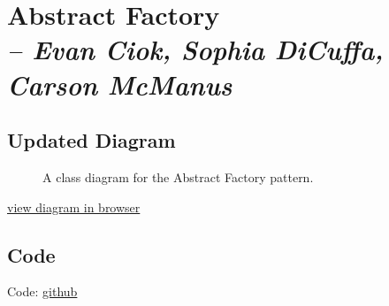 \chapter{Abstract Factory \\
  \small{\textit{-- Evan Ciok, Sophia DiCuffa, Carson McManus}}
  \label{Chapter::AbstractFactory}}

\section{Updated Diagram}

\begin{figure}[htb]
  \centering
  \caption{\label{Figure::pizzadiagram} A class diagram for the Abstract Factory pattern.}
\end{figure}

\href{https://github.com/dyc3/ssw345-group-assignments/blob/main/Figures/abstractFactory/figures-source.md}{view diagram in browser}

\section{Code}

Code: \href{https://github.com/dyc3/ssw345-group-assignments}{github}